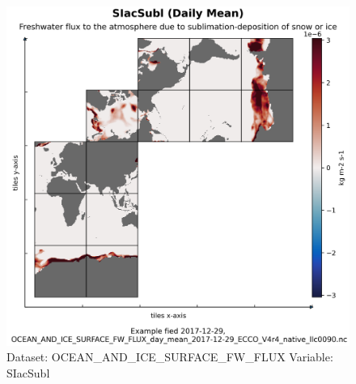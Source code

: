 \begin{figure}[H]
\centering
\includegraphics[width=\textwidth]{../images/plots/native_plots/Ocean_and_Sea-Ice_Surface_Freshwater_Fluxes/SIacSubl.png}
\caption{Dataset: OCEAN\_AND\_ICE\_SURFACE\_FW\_FLUX Variable: SIacSubl}
\label{tab:table-OCEAN_AND_ICE_SURFACE_FW_FLUX_SIacSubl-Plot}
\end{figure}
\pagebreak
